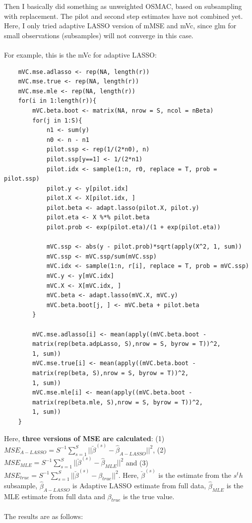 \documentclass[]{article}
\begin{document}
Then I basically did something as unweighted OSMAC, based on subsampling with replacement. The pilot and second step estimates have not combined yet. Here, I only tried adaptive LASSO version of mMSE and mVc, since glm for small observations (subsamples) will not converge in this case.\\
\\
For example, this is the mVc for adaptive LASSO:\\
\begin{lstlisting}
	mVC.mse.adlasso <- rep(NA, length(r))
	mVC.mse.true <- rep(NA, length(r))
	mVC.mse.mle <- rep(NA, length(r))
	for(i in 1:length(r)){
		mVC.beta.boot <- matrix(NA, nrow = S, ncol = nBeta)
		for(j in 1:S){
			n1 <- sum(y)
			n0 <- n - n1
			pilot.ssp <- rep(1/(2*n0), n)
			pilot.ssp[y==1] <- 1/(2*n1)
			pilot.idx <- sample(1:n, r0, replace = T, prob = pilot.ssp)
			pilot.y <- y[pilot.idx]
			pilot.X <- X[pilot.idx, ]
			pilot.beta <- adapt.lasso(pilot.X, pilot.y)
			pilot.eta <- X %*% pilot.beta
			pilot.prob <- exp(pilot.eta)/(1 + exp(pilot.eta))
			
			mVC.ssp <- abs(y - pilot.prob)*sqrt(apply(X^2, 1, sum))
			mVC.ssp <- mVC.ssp/sum(mVC.ssp)
			mVC.idx <- sample(1:n, r[i], replace = T, prob = mVC.ssp)
			mVC.y <- y[mVC.idx]
			mVC.X <- X[mVC.idx, ]
			mVC.beta <- adapt.lasso(mVC.X, mVC.y)
			mVC.beta.boot[j, ] <- mVC.beta + pilot.beta
		}
		
		mVC.mse.adlasso[i] <- mean(apply((mVC.beta.boot -
		matrix(rep(beta.adpLasso, S),nrow = S, byrow = T))^2,
		1, sum))
		mVC.mse.true[i] <- mean(apply((mVC.beta.boot -
		matrix(rep(beta, S),nrow = S, byrow = T))^2,
		1, sum))
		mVC.mse.mle[i] <- mean(apply((mVC.beta.boot -
		matrix(rep(beta.mle, S),nrow = S, byrow = T))^2,
		1, sum))
	}
\end{lstlisting}
Here, \textbf{three versions of MSE are calculated}: (1) $MSE_{A-LASSO}=S^{-1}\sum_{s=1}^{S}|| \breve{\beta}^{(s)} - \hat{\beta}_{A-LASSO}||^2$, (2) $MSE_{MLE}=S^{-1}\sum_{s=1}^{S}|| \breve{\beta}^{(s)} - \hat{\beta}_{MLE}||^2$ and (3) $MSE_{true}=S^{-1}\sum_{s=1}^{S}|| \breve{\beta}^{(s)} - \beta_{true}||^2$. Here, $\breve{\beta}^{(s)}$ is the estimate from the $s^th$ subsample, $\hat{\beta}_{A-LASSO}$ is Adaptive LASSO estimate from full data, $\hat{\beta}_{MLE}$ is the MLE estimate from full data and $\beta_{true}$ is the true value.\\
\\
The results are as follows:\\
\end{document}
